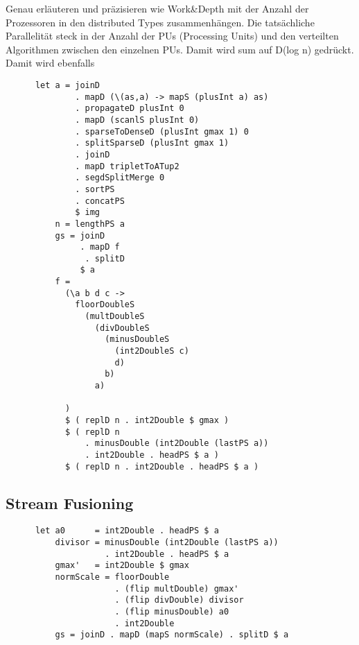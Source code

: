       Genau erläuteren und präzisieren wie Work&Depth mit der Anzahl der Prozessoren in den distributed Types zusammenhängen.
        Die tatsächliche Parallelität steck in der Anzahl der PUs (Processing Units) und den verteilten Algorithmen
        zwischen den einzelnen PUs. Damit wird sum auf D(log n) gedrückt. Damit wird ebenfalls 
      
      
      
      \begin{lstlisting}
      let a = joinD
              . mapD (\(as,a) -> mapS (plusInt a) as)
              . propagateD plusInt 0
              . mapD (scanlS plusInt 0)
              . sparseToDenseD (plusInt gmax 1) 0
              . splitSparseD (plusInt gmax 1)
              . joinD
              . mapD tripletToATup2
              . segdSplitMerge 0
              . sortPS
              . concatPS
              $ img
          n = lengthPS a
          gs = joinD
               . mapD f
                . splitD
               $ a
          f =
            (\a b d c ->
              floorDoubleS
                (multDoubleS
                  (divDoubleS
                    (minusDoubleS
                      (int2DoubleS c)
                      d)
                    b)
                  a)
              
            )
            $ ( replD n . int2Double $ gmax )
            $ ( replD n
                . minusDouble (int2Double (lastPS a))
                . int2Double . headPS $ a )
            $ ( replD n . int2Double . headPS $ a )
      \end{lstlisting}
      
      
      
    \subsection{Stream Fusioning}
      \begin{lstlisting}
      let a0      = int2Double . headPS $ a 
          divisor = minusDouble (int2Double (lastPS a))
                    . int2Double . headPS $ a
          gmax'   = int2Double $ gmax
          normScale = floorDouble
                      . (flip multDouble) gmax'
                      . (flip divDouble) divisor
                      . (flip minusDouble) a0
                      . int2Double
          gs = joinD . mapD (mapS normScale) . splitD $ a
       \end{lstlisting}
      
